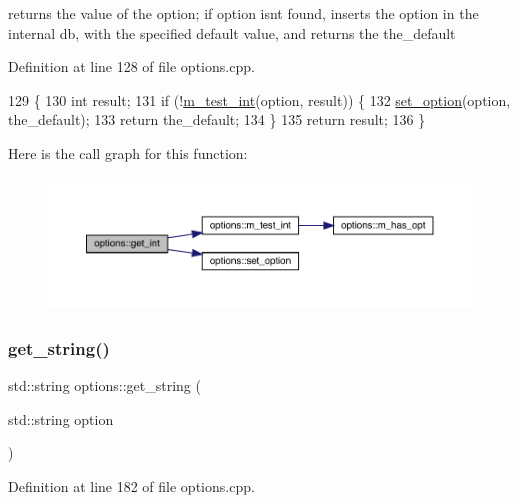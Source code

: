 returns the value of the option; if option isn\textquotesingle{}t found, inserts the option in the internal db, with the specified default value, and returns the the\+\_\+default 

Definition at line 128 of file options.\+cpp.


\begin{DoxyCode}
129 \{
130   \textcolor{keywordtype}{int} result;
131   \textcolor{keywordflow}{if} (!\hyperlink{classoptions_ad9b4461e633b73acc2fde7752ef60d41}{m\_test\_int}(option, result)) \{
132     \hyperlink{classoptions_a3c23831e4218f9a88cddc81337518046}{set\_option}(option, the\_default);
133     \textcolor{keywordflow}{return} the\_default;
134   \}
135   \textcolor{keywordflow}{return} result;
136 \}
\end{DoxyCode}
Here is the call graph for this function\+:\nopagebreak
\begin{figure}[H]
\begin{center}
\leavevmode
\includegraphics[width=350pt]{classoptions_a0a17d018f4b64f85091f3ec21de029f0_cgraph}
\end{center}
\end{figure}
\mbox{\label{classoptions_aeb84be21a30b0dd41d7d9f3f52c0f3f7}} 
\subsubsection{\texorpdfstring{get\+\_\+string()}{get\_string()}\hspace{0.1cm}{\footnotesize\ttfamily [1/2]}}
{\footnotesize\ttfamily std\+::string options\+::get\+\_\+string (\begin{DoxyParamCaption}\item[{std\+::string}]{option }\end{DoxyParamCaption})}



Definition at line 182 of file options.\+cpp.



